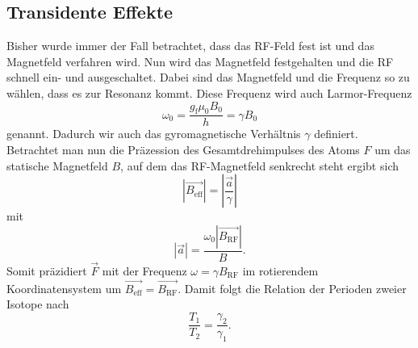 \subsection{Transidente Effekte}
\label{sec:transident}
Bisher wurde immer der Fall betrachtet, dass das RF-Feld fest ist und das Magnetfeld verfahren wird. Nun wird
das Magnetfeld festgehalten und die RF schnell ein- und ausgeschaltet. Dabei sind das Magnetfeld und die Frequenz
so zu wählen, dass es zur Resonanz kommt. Diese Frequenz wird auch Larmor-Frequenz
\begin{equation}
  \label{eqn:larmor}
  \omega_0 = \frac{g_\text{f} \mu_0 B_0}{h} = \gamma B_0
\end{equation}
genannt. Dadurch wir auch das gyromagnetische Verhältnis $\gamma$ definiert.
Betrachtet man nun die Präzession des Gesamtdrehimpulses des Atoms $F$ um das statische Magnetfeld $B$, auf dem das RF-Magnetfeld senkrecht steht 
ergibt sich 
\begin{equation*}
  |\vec{B_\text{eff}}| = \left|\frac{\vec{a}}{\gamma}\right|
\end{equation*}
mit 
\begin{equation*}
  |\vec{a}| = \frac{\omega_0 |\vec{B_\text{RF}}|}{B}.
\end{equation*}
Somit präzidiert $\vec{F}$ mit der Frequenz $\omega = \gamma B_\text{RF}$ im rotierendem Koordinatensystem um
$\vec{B_\text{eff}} = \vec{B_\text{RF}}$. Damit folgt die Relation der Perioden zweier Isotope nach
\begin{equation*}
  \frac{T_1}{T_2} = \frac{\gamma_2}{\gamma_1}.
\end{equation*}

\FloatBarrier



